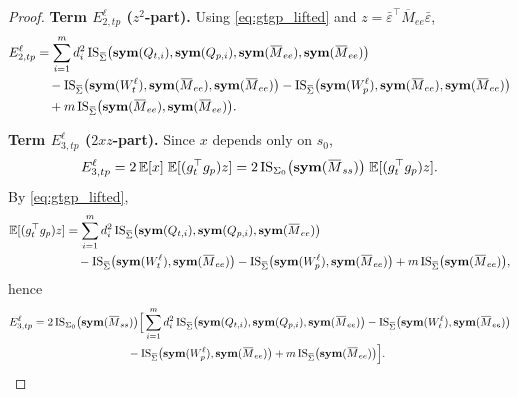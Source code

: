 \begin{proof}
\medskip
\noindent\textbf{Term $E^{\ell}_{2,tp}$ ($z^2$-part).}
Using \eqref{eq:gtgp_lifted} and $z=\bar\varepsilon^\top\overline M_{ee}\bar\varepsilon$,
\begin{align}
E^{\ell}_{2,tp}
&=\sum_{i=1}^m d_i^2\,
\mathrm{IS}_{\overline\Sigma} \big(\symfun(Q_{t,i}),\symfun(Q_{p,i}),\symfun(\overline M_{ee}),\symfun(\overline M_{ee})\big)\notag\\
&\quad-\mathrm{IS}_{\overline\Sigma} \big(\symfun(W^\ell_t),\symfun(\overline M_{ee}),\symfun(\overline M_{ee})\big)
-\mathrm{IS}_{\overline\Sigma} \big(\symfun(W^\ell_p),\symfun(\overline M_{ee}),\symfun(\overline M_{ee})\big)\notag\\
&\quad+m\,\mathrm{IS}_{\overline\Sigma} \big(\symfun(\overline M_{ee}),\symfun(\overline M_{ee})\big).
\label{eq:Btp_ell_final}
\end{align}

\medskip
\noindent\textbf{Term $E^{\ell}_{3,tp}$ ($2xz$-part).}
Since $x$ depends only on $s_0$,
\[
E^{\ell}_{3,tp}=2\,\mathbb E[x]\;\mathbb E[(g_t^\top g_p)z]
=2\,\mathrm{IS}_{\Sigma_0} \big(\symfun(\overline M_{ss})\big)\;\mathbb E[(g_t^\top g_p)z].
\]
By \eqref{eq:gtgp_lifted},
\begin{align}
\mathbb E[(g_t^\top g_p)z]
&=\sum_{i=1}^m d_i^2\,
\mathrm{IS}_{\overline\Sigma} \big(\symfun(Q_{t,i}),\symfun(Q_{p,i}),\symfun(\overline M_{ee})\big)\notag\\
&\quad-\mathrm{IS}_{\overline\Sigma} \big(\symfun(W^\ell_t),\symfun(\overline M_{ee})\big)
-\mathrm{IS}_{\overline\Sigma} \big(\symfun(W^\ell_p),\symfun(\overline M_{ee})\big)
+m\,\mathrm{IS}_{\overline\Sigma} \big(\symfun(\overline M_{ee})\big),
\end{align}
hence
\begin{align}\label{eq:Ctp_ell_final}
E^{\ell}_{3,tp}
&=2\,\mathrm{IS}_{\Sigma_0} \big(\symfun(\overline M_{ss})\big)\Big[
\sum_{i=1}^m d_i^2\,
\mathrm{IS}_{\overline\Sigma} \big(\symfun(Q_{t,i}),\symfun(Q_{p,i}),\symfun(\overline M_{ee})\big)
-\mathrm{IS}_{\overline\Sigma} \big(\symfun(W^\ell_t),\symfun(\overline M_{ee})\big)\notag\\
&\hspace{3.0cm}
-\mathrm{IS}_{\overline\Sigma} \big(\symfun(W^\ell_p),\symfun(\overline M_{ee})\big)
+m\,\mathrm{IS}_{\overline\Sigma} \big(\symfun(\overline M_{ee})\big)\Big].
\end{align}


\end{proof}
